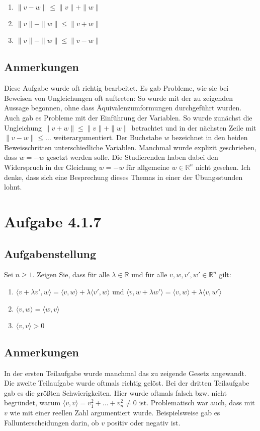\documentclass[a4paper]{article}
\newcommand*{\R}{\mathbb R}
\begin{document}
\begin{enumerate}
  \item $\|v-w\| \le \|v\|+\|w\|$
  \item $\|v\|-\|w\| \le \|v+w\|$
  \item $\|v\|-\|w\| \le \|v-w\|$
\end{enumerate}

\subsection{Anmerkungen}

Diese Aufgabe wurde oft richtig bearbeitet. Es gab Probleme, wie sie bei Beweisen von Ungleichungen oft auftreten: So wurde mit der zu zeigenden Aussage begonnen, ohne dass Äquivalenzumformungen durchgeführt wurden. Auch gab es Probleme mit der Einführung der Variablen. So wurde zunächst die Ungleichung $\|v+w\| \le \|v\| + \|w\|$ betrachtet und in der nächsten Zeile mit $\|v-w\| \le \ldots$ weiterargumentiert. Der Buchstabe $w$ bezeichnet in den beiden Beweisschritten unterschiedliche Variablen. Manchmal wurde explizit geschrieben, dass $w=-w$ gesetzt werden solle. Die Studierenden haben dabei den Widerspruch in der Gleichung $w=-w$ für allgemeine $w\in\R^n$ nicht gesehen. Ich denke, dass sich eine Besprechung dieses Themas in einer der Übungsstunden lohnt.

\section{Aufgabe 4.1.7}

\subsection{Aufgabenstellung}

\newcommand*{\s}[1]{\langle {#1} \rangle}

Sei $n\ge1$. Zeigen Sie, dass für alle $\lambda\in\R$ und für alle $v,w,v',w'\in\R^n$ gilt:

\begin{enumerate}
  \item $\s{v+\lambda v',w} = \s{v,w} + \lambda \s{v',w}$ und $\s{v,w+\lambda w'} = \s{v,w} + \lambda \s{v,w'}$
  \item $\s{v,w} = \s{w,v}$
  \item $\s{v,v} > 0$
\end{enumerate}

\subsection{Anmerkungen}

In der ersten Teilaufgabe wurde manchmal das zu zeigende Gesetz angewandt. Die zweite Teilaufgabe wurde oftmals richtig gelöst. Bei der dritten Teilaufgabe gab es die größten Schwierigkeiten. Hier wurde oftmals falsch bzw. nicht begründet, warum $\s{v,v} = v_1^2+\ldots+v_n^2 \neq 0$ ist. Problematisch war auch, dass mit $v$ wie mit einer reellen Zahl argumentiert wurde. Beispielsweise gab es Fallunterscheidungen darin, ob $v$ positiv oder negativ ist.
\end{document}
